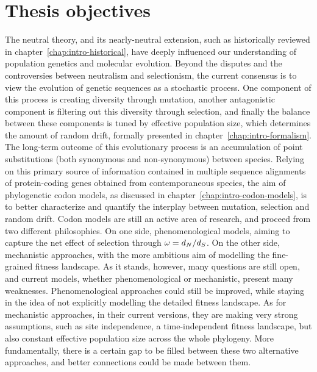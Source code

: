 \chapter{Thesis objectives}
{\hypersetup{linkcolor=GREYDARK}\minitoc}
\label{chap:goals}

The neutral theory, and its nearly-neutral extension, such as historically reviewed in chapter~\ref{chap:intro-historical}, have deeply influenced our understanding of population genetics and molecular evolution.
Beyond the disputes and the controversies between neutralism and selectionism, the current consensus is to view the evolution of genetic sequences as a stochastic process.
One component of this process is creating diversity through mutation, another antagonistic component is filtering out this diversity through selection, and finally the balance between these components is tuned by effective population size, which determines the amount of random drift, formally presented in chapter~\ref{chap:intro-formalism}.
The long-term outcome of this evolutionary process is an accumulation of point substitutions (both synonymous and non-synonymous) between species.
Relying on this primary source of information contained in multiple sequence alignments of protein-coding genes obtained from contemporaneous species, the aim of phylogenetic codon models, as discussed in chapter~\ref{chap:intro-codon-models}, is to better characterize and quantify the interplay between mutation, selection and random drift.
Codon models are still an active area of research, and proceed from two different philosophies.
On one side, phenomenological models, aiming to capture the net effect of selection through $\omega = d_N / d_S$.
On the other side, mechanistic approaches, with the more ambitious aim of modelling the fine-grained fitness landscape.
As it stands, however, many questions are still open, and current models, whether phenomenological or mechanistic, present many weaknesses.
Phenomenological approaches could still be improved, while staying in the idea of not explicitly modelling the detailed fitness landscape.
As for mechanistic approaches, in their current versions, they are making very strong assumptions, such as site independence, a time-independent fitness landscape, but also constant effective population size across the whole phylogeny.
More fundamentally, there is a certain gap to be filled between these two alternative approaches, and better connections could be made between them.


